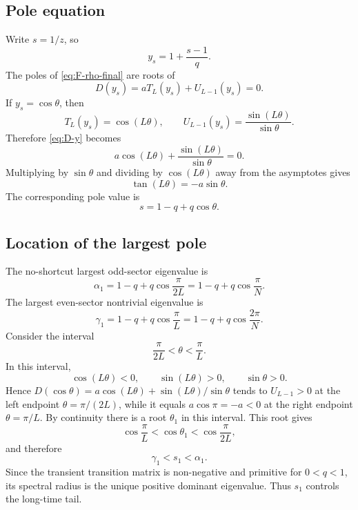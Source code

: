 \documentclass[11pt]{article}
\begin{document}
\subsection{Pole equation}

Write $s=1/z$, so
\begin{equation}
  y_s=1+\frac{s-1}{q}.
\end{equation}
The poles of \eqref{eq:F-rho-final} are roots of
\begin{equation}
  D(y_s)=aT_L(y_s)+U_{L-1}(y_s)=0.
  \label{eq:D-y}
\end{equation}
If $y_s=\cos\theta$, then
\begin{equation}
  T_L(y_s)=\cos(L\theta),
  \qquad
  U_{L-1}(y_s)=\frac{\sin(L\theta)}{\sin\theta}.
\end{equation}
Therefore \eqref{eq:D-y} becomes
\begin{equation}
  a\cos(L\theta)+\frac{\sin(L\theta)}{\sin\theta}=0.
\end{equation}
Multiplying by $\sin\theta$ and dividing by $\cos(L\theta)$ away from the asymptotes gives
\begin{equation}
  \boxed{\tan(L\theta)=-a\sin\theta.}
  \label{eq:theta-root}
\end{equation}
The corresponding pole value is
\begin{equation}
  \boxed{s=1-q+q\cos\theta.}
  \label{eq:s-theta}
\end{equation}

\subsection{Location of the largest pole}

The no-shortcut largest odd-sector eigenvalue is
\begin{equation}
  \alpha_1=1-q+q\cos\frac{\pi}{2L}=1-q+q\cos\frac{\pi}{N}.
\end{equation}
The largest even-sector nontrivial eigenvalue is
\begin{equation}
  \gamma_1=1-q+q\cos\frac{\pi}{L}=1-q+q\cos\frac{2\pi}{N}.
\end{equation}
Consider the interval
\begin{equation}
  \frac{\pi}{2L}<\theta<\frac{\pi}{L}.
\end{equation}
In this interval,
\begin{equation}
  \cos(L\theta)<0,
  \qquad
  \sin(L\theta)>0,
  \qquad
  \sin\theta>0.
\end{equation}
Hence $D(\cos\theta)=a\cos(L\theta)+\sin(L\theta)/\sin\theta$ tends to $U_{L-1}>0$ at the left
endpoint $\theta=\pi/(2L)$, while it equals $a\cos\pi=-a<0$ at the right endpoint
$\theta=\pi/L$.  By continuity there is a root $\theta_1$ in this interval.  This root gives
\begin{equation}
  \cos\frac{\pi}{L}<\cos\theta_1<\cos\frac{\pi}{2L},
\end{equation}
and therefore
\begin{equation}
  \boxed{\gamma_1<s_1<\alpha_1.}
\end{equation}
Since the transient transition matrix is non-negative and primitive for $0<q<1$, its spectral
radius is the unique positive dominant eigenvalue.  Thus $s_1$ controls the long-time tail.
\end{document}
